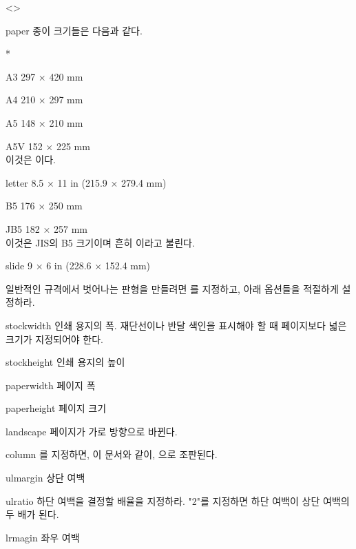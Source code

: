 \documentclass[pairquote, minted]{hzguide}
\begin{document}
\begin{macros}<\LayoutSetup>
\item[paper] 
종이 크기들은 다음과 같다.
\begin{macros}*
\item[A3] 297 × 420 mm 
\item[A4] 210 × 297 mm 
\item[A5] 148 × 210 mm 
\item[A5V] 152 × 225 mm \\ 이것은 이다.
\item[letter] 8.5 × 11 in (215.9 × 279.4 mm)
\item[B5] 176 × 250 mm
\item[JB5] 182 × 257 mm \\ 이것은 JIS의 B5 크기이며 흔히 이라고 불린다.
\item[slide] 9 × 6 in (228.6 × 152.4 mm)
\end{macros}

일반적인 규격에서 벗어나는 판형을 만들려면 를 지정하고, 아래 옵션들을 적절하게 설정하라.

\item[stockwidth] \keyvalue{250mm}
인쇄 용지의 폭. 재단선이나 반달 색인을 표시해야 할 때 페이지보다 넓은 크기가 지정되어야 한다.

\item[stockheight] \keyvalue{353mm}
인쇄 용지의 높이

\item[paperwidth] \keyvalue{210mm}
페이지 폭

\item[paperheight] \keyvalue{297mm}
페이지 크기

\item[landscape] \keyvalueTF
페이지가 가로 방향으로 바뀐다.

\item[column]  
를 지정하면, 이 문서와 같이, 으로 조판된다.

\item[ulmargin] \keyvalue{36mm}
상단 여백

\item[ulratio] 
하단 여백을 결정할 배율을 지정하라. "2"를 지정하면 하단 여백이 상단 여백의 두 배가 된다.

\item[lrmagin] \keyvalue{35mm}
좌우 여백


\end{macros}
\end{document}
